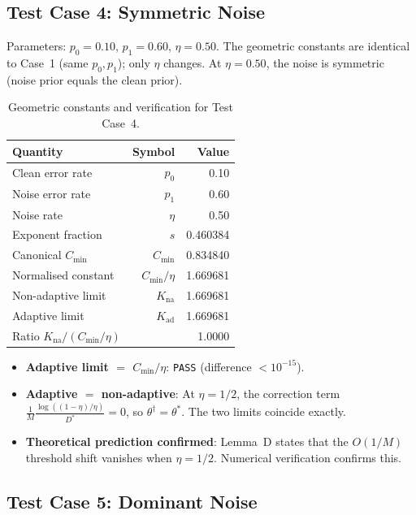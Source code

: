 \documentclass[article]{amsart}
\theoremstyle{definition}
\begin{document}
\subsection{Test Case 4: Symmetric Noise}

Parameters: $p_0 = 0.10$, $p_1 = 0.60$, $\eta = 0.50$. The geometric constants are identical to Case~1 (same $p_0, p_1$); only $\eta$ changes. At $\eta = 0.50$, the noise is symmetric (noise prior equals the clean prior).

\begin{table}[htbp]
\centering
\caption{Geometric constants and verification for Test Case~4.}
\label{tab:case4}
\begin{tabular}{lrr}
\toprule
Quantity & Symbol & Value \\
\midrule
Clean error rate & $p_0$ & 0.10 \\
Noise error rate & $p_1$ & 0.60 \\
Noise rate & $\eta$ & 0.50 \\
Exponent fraction & $s$ & 0.460384 \\
\midrule
Canonical $C_{\min}$ & $C_{\min}$ & 0.834840 \\
Normalised constant & $C_{\min}/\eta$ & 1.669681 \\
Non-adaptive limit & $K_{\mathrm{na}}$ & 1.669681 \\
Adaptive limit & $K_{\mathrm{ad}}$ & 1.669681 \\
Ratio $K_{\mathrm{na}} / (C_{\min}/\eta)$ & & 1.0000 \\
\bottomrule
\end{tabular}
\end{table}

\begin{itemize}
    \item\textbf{Adaptive limit $=$ $C_{\min}/\eta$}: \texttt{PASS} (difference $< 10^{-15}$).
    \item\textbf{Adaptive $=$ non-adaptive}: At $\eta = 1/2$, the correction term $\frac{1}{M}\frac{\log((1-\eta)/\eta)}{D^*} = 0$, so $\theta^\dagger = \theta^*$. The two limits coincide exactly.
    \item\textbf{Theoretical prediction confirmed}: Lemma~D states that the $O(1/M)$ threshold shift vanishes when $\eta = 1/2$. Numerical verification confirms this.
\end{itemize}

\subsection{Test Case 5: Dominant Noise}
\end{document}

